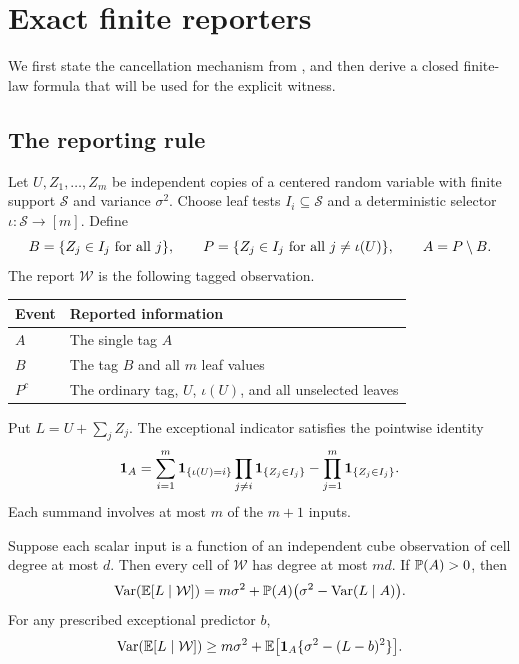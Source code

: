 \section{Exact finite reporters}
\label{sec:reporter}

We first state the cancellation mechanism from
\cite[Sections 1--2]{OpenAI2026}, and then derive a closed finite-law
formula that will be used for the explicit witness.

\subsection{The reporting rule}

Let \(U,Z_1,\ldots,Z_m\) be independent copies of a centered random
variable with finite support \(\mathcal S\) and variance \(\sigma^2\).
Choose leaf tests \(I_i\subseteq\mathcal S\) and a deterministic selector
\(\iota:\mathcal S\to[m]\). Define
\[
 B=\{Z_j\in I_j\ \hbox{for all }j\},\qquad
 P=\{Z_j\in I_j\ \hbox{for all }j\ne\iota(U)\},\qquad
 A=P\setminus B.
\]
The report \(\mathcal W\) is the following tagged observation.
\begin{center}
\begin{tabular}{@{}ll@{}}
\toprule
Event & Reported information\\
\midrule
\(A\) & The single tag \(A\)\\
\(B\) & The tag \(B\) and all \(m\) leaf values\\
\(P^c\) & The ordinary tag, \(U\), \(\iota(U)\), and all unselected leaves\\
\bottomrule
\end{tabular}
\end{center}
Put \(L=U+\sum_j Z_j\). The exceptional indicator satisfies the
pointwise identity
\begin{equation}\label{eq:reporter-cancellation}
 \mathbf 1_A=
 \sum_{i=1}^m\mathbf 1_{\{\iota(U)=i\}}
       \prod_{j\ne i}\mathbf 1_{\{Z_j\in I_j\}}
 -\prod_{j=1}^m\mathbf 1_{\{Z_j\in I_j\}}.
\end{equation}
Each summand involves at most \(m\) of the \(m+1\) inputs.

\begin{proposition}
\label{prop:reporter}
Suppose each scalar input is a function of an independent cube
observation of cell degree at most \(d\). Then every cell of
\(\mathcal W\) has degree at most \(md\). If \(\mathbb P(A)>0\), then
\begin{equation}\label{eq:optimal-exceptional}
 \operatorname{Var}(\mathbb E[L\mid\mathcal W])
 =m\sigma^2+\mathbb P(A)\bigl(\sigma^2-\operatorname{Var}(L\mid A)\bigr).
\end{equation}
For any prescribed exceptional predictor \(b\),
\begin{equation}\label{eq:reporter-predictor}
 \operatorname{Var}(\mathbb E[L\mid\mathcal W])
 \ge m\sigma^2+
 \mathbb E\bigl[\mathbf 1_A\{\sigma^2-(L-b)^2\}\bigr].
\end{equation}
\end{proposition}

